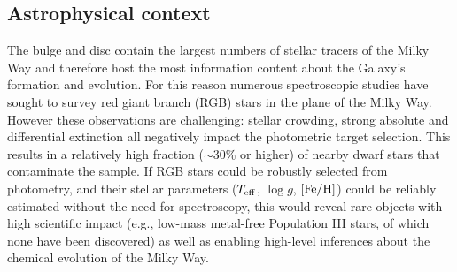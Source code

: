 \documentclass[a4paper]{article}
\begin{document}
%
%
\begin{ObservingProgram}
%
%
%
%
%
%
%
\subsection*{Astrophysical context}

The bulge and disc contain the largest numbers of stellar tracers of the Milky Way and therefore host the most information content about the Galaxy's formation and evolution.  For this reason numerous spectroscopic studies have sought to survey red giant branch (RGB) stars in the plane of the Milky Way.  However these observations are challenging: stellar crowding, strong absolute and differential extinction all negatively impact the photometric target selection.  This results in a relatively high fraction ($\sim$30\% or higher) of nearby dwarf stars that contaminate the sample.  If RGB stars could be robustly selected from photometry, and their stellar parameters ($T_{\rm eff}$, $\log{g}$, ${\rm [Fe/H]}$) could be reliably estimated without the need for spectroscopy, this would reveal rare objects with high scientific impact (e.g., low-mass metal-free Population III stars, of which none have been discovered) as well as enabling high-level inferences about the chemical evolution of the Milky Way.



\end{ObservingProgram}
\end{document}
